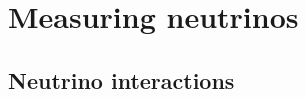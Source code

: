 \chapter{Measuring neutrinos} %
\label{chap:exp} %

\section{Neutrino interactions} %
\label{sec:exp_interactions} %

